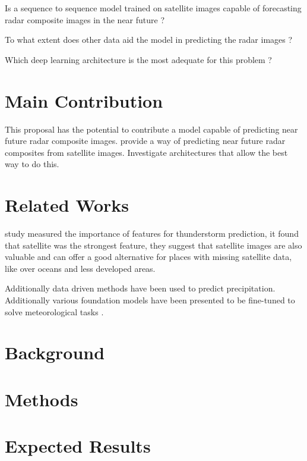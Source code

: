 \documentclass[acmtog, authorversion]{acmart}
\begin{document}
\begin{questions}
    \item Is a sequence to sequence model trained on satellite images capable of forecasting radar composite images in the near future ?
    \item To what extent does other data aid the model in predicting the radar images ?
    \item Which deep learning architecture is the most adequate for this problem ?\label{itm:qwithlabel}
\end{questions}

\section{Main Contribution}
This proposal has the potential to contribute a model capable of predicting near future radar composite images.
provide a way of predicting near future radar composites from satellite images. Investigate architectures that allow the best way to do this.

\section{Related Works}

study \cite{nhess-22-577-2022} measured the importance of features for thunderstorm prediction, it found that satellite was the strongest feature, they suggest that satellite images are also valuable and can offer a good alternative for places with missing satellite data, like over oceans and less developed areas.

Additionally data driven methods have been used to predict precipitation. Additionally various foundation models have been presented to be fine-tuned to solve meteorological tasks \cite{nguyen2023climax, bi2022panguweather}.

\section{Background}

\section{Methods}

\section{Expected Results}
\end{document}
